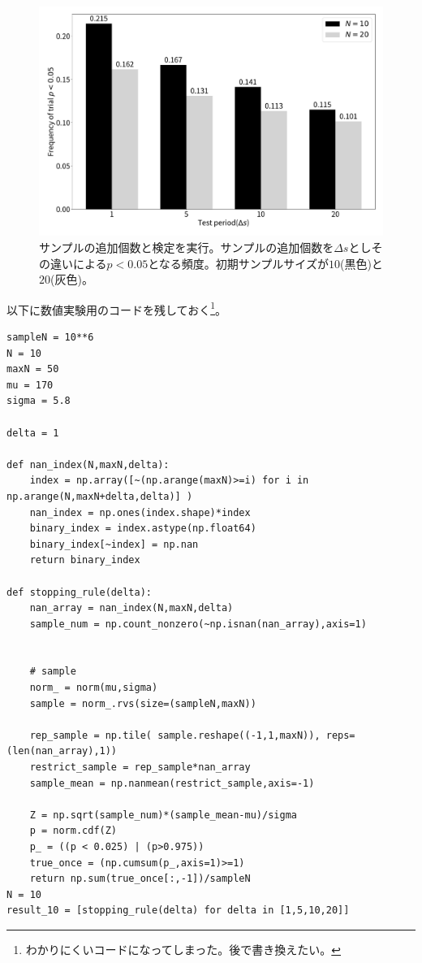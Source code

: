 \begin{figure}
  \begin{center}
    \includegraphics[width=15cm]{./image/04_/multiple_test_additional_sample.pdf}
    \caption{サンプルの追加個数と検定を実行。サンプルの追加個数を$\Delta s$としその違いによる$p<0.05$となる頻度。初期サンプルサイズが$10$(黒色)と$20$(灰色)。}
        \label{fig:multiple_test_additional_sample}
    \end{center}
\end{figure}

以下に数値実験用のコードを残しておく\footnote{わかりにくいコードになってしまった。後で書き換えたい。}。
\begin{lstlisting}
sampleN = 10**6
N = 10
maxN = 50
mu = 170
sigma = 5.8

delta = 1

def nan_index(N,maxN,delta):
    index = np.array([~(np.arange(maxN)>=i) for i in np.arange(N,maxN+delta,delta)] )
    nan_index = np.ones(index.shape)*index
    binary_index = index.astype(np.float64)
    binary_index[~index] = np.nan
    return binary_index

def stopping_rule(delta):
    nan_array = nan_index(N,maxN,delta)
    sample_num = np.count_nonzero(~np.isnan(nan_array),axis=1)


    # sample
    norm_ = norm(mu,sigma)
    sample = norm_.rvs(size=(sampleN,maxN))

    rep_sample = np.tile( sample.reshape((-1,1,maxN)), reps= (len(nan_array),1))
    restrict_sample = rep_sample*nan_array
    sample_mean = np.nanmean(restrict_sample,axis=-1)

    Z = np.sqrt(sample_num)*(sample_mean-mu)/sigma
    p = norm.cdf(Z)
    p_ = ((p < 0.025) | (p>0.975))
    true_once = (np.cumsum(p_,axis=1)>=1)
    return np.sum(true_once[:,-1])/sampleN
N = 10
result_10 = [stopping_rule(delta) for delta in [1,5,10,20]]
\end{lstlisting}

